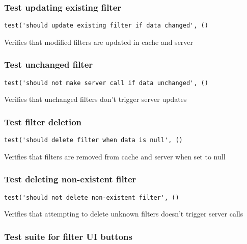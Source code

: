 \documentclass[a4paper]{article}
\begin{document}
\hypertarget{toc161}{}
\subsubsection{Test updating existing filter}

\begin{lstlisting}
test('should update existing filter if data changed', ()
\end{lstlisting}

Verifies that modified filters are updated in cache and server

\hypertarget{toc162}{}
\subsubsection{Test unchanged filter}

\begin{lstlisting}
test('should not make server call if data unchanged', ()
\end{lstlisting}

Verifies that unchanged filters don't trigger server updates

\hypertarget{toc163}{}
\subsubsection{Test filter deletion}

\begin{lstlisting}
test('should delete filter when data is null', ()
\end{lstlisting}

Verifies that filters are removed from cache and server when set to null

\hypertarget{toc164}{}
\subsubsection{Test deleting non-existent filter}

\begin{lstlisting}
test('should not delete non-existent filter', ()
\end{lstlisting}

Verifies that attempting to delete unknown filters doesn't trigger server calls

\hypertarget{toc165}{}
\subsubsection{Test suite for filter UI buttons}
\end{document}
